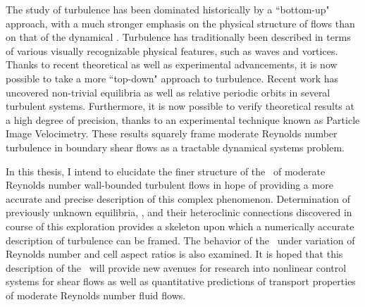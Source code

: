 

The study of turbulence has been dominated historically by a ``bottom-up"
approach, with a much stronger emphasis on the physical structure of flows
than on that of the dynamical \statesp.  Turbulence has traditionally
been described in terms of various visually recognizable physical
features, such as waves and vortices.  Thanks to recent theoretical as
well as experimental advancements, it is now possible to take a more
``top-down" approach to turbulence.  Recent work has uncovered non-trivial
equilibria as well as relative periodic orbits in several turbulent
systems.  Furthermore, it is now possible to verify theoretical results at
a high degree of precision, thanks to an experimental technique known as
Particle Image Velocimetry.  These results squarely frame moderate
Reynolds number turbulence
in boundary shear flows as a
tractable dynamical systems problem.

In this thesis, I intend to elucidate
the finer structure of the \statesp\ of moderate Reynolds number
wall-bounded turbulent flows in hope of providing a more accurate and
precise description of this complex phenomenon.  Determination of
previously unknown
equilibria, \reqva, and their heteroclinic connections discovered
in course of this exploration
provides a skeleton upon which a numerically accurate description of
turbulence can be framed.  The behavior of the \eqva\ under variation of
Reynolds number and cell aspect ratios is also examined.
It is hoped that this description of the
\statesp\ will provide new avenues for research into nonlinear control systems
for shear flows as well as quantitative predictions of transport properties
of moderate Reynolds number fluid flows.

